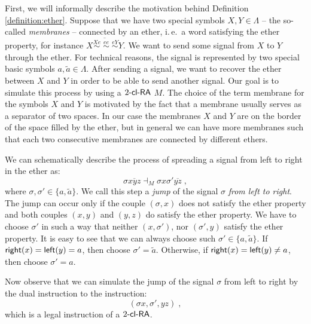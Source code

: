 First, we will informally describe the motivation behind Definition \ref{definition:ether}. Suppose that we have two special symbols $X, Y \in \Lambda$ -- the so-called \emph{membranes} -- connected by an ether, i.\,e.\ a word satisfying the ether property, for instance $\overline{X \stackrel{Xe}{\sim} \; \stackrel{ee}{\sim} \; \stackrel{eY}{\sim} Y}$. We want to send some signal from $X$ to $Y$ through the ether. For technical reasons, the signal is represented by two special basic symbols $a, \tilde{a} \in \Lambda$. After sending a signal, we want to recover the ether between $X$ and $Y$ in order to be able to send another signal. Our goal is to simulate this process by using a $\kclRA[2]$ $M$. The choice of the term membrane for the symbols $X$ and $Y$ is motivated by the fact that a membrane usually serves as a separator of two spaces. In our case the membranes $X$ and $Y$ are on the border of the space filled by the ether, but in general we can have more membranes such that each two consecutive membranes are connected by different ethers.

We can schematically describe the process of spreading a signal from left to right in the ether as:
$$\sigma \overline{x y z} \dashv_M \sigma x \sigma' \overline{y z}\;,$$
where $\sigma, \sigma' \in \{a, \tilde{a}\}$. We call this step a \emph{jump} of the signal $\sigma$ \emph{from left to right}. The jump can occur only if the couple $(\sigma, x)$ does not satisfy the ether property and both couples $(x, y)$ and $(y, z)$ do satisfy the ether property. We have to choose $\sigma'$ in such a way that neither $(x, \sigma')$, nor $(\sigma', y)$ satisfy the ether property. It is easy to see that we can always choose such $\sigma' \in \{a, \tilde{a}\}$. If ${\sf right}(x) = {\sf left}(y) = a$, then choose $\sigma' = \tilde{a}$. Otherwise, if ${\sf right}(x) = {\sf left}(y) \neq a$, then choose $\sigma' = a$.

Now observe that we can simulate the jump of the signal $\sigma$ from left to right by the dual instruction to the instruction:
$$(\sigma x, \sigma', yz)\;,$$
which is a legal instruction of a $\kclRA[2]$.


